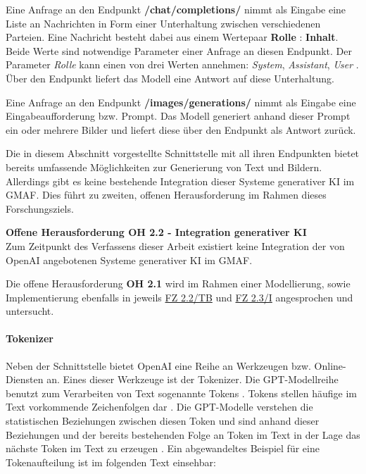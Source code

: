 Eine Anfrage an den Endpunkt \textbf{/chat/completions/} nimmt als Eingabe eine Liste an Nachrichten in Form einer Unterhaltung zwischen verschiedenen Parteien.
Eine Nachricht besteht dabei aus einem Wertepaar \textbf{Rolle} : \textbf{Inhalt}.
Beide Werte sind notwendige Parameter einer Anfrage an diesen Endpunkt.
Der Parameter \textit{Rolle} kann einen von drei Werten annehmen: \textit{System}, \textit{Assistant}, \textit{User} \cite{openai-chat-compl-roles}.
Über den Endpunkt liefert das Modell eine Antwort auf diese Unterhaltung.

Eine Anfrage an den Endpunkt \textbf{/images/generations/} nimmt als Eingabe eine Eingabeaufforderung bzw. Prompt.
Das Modell generiert anhand dieser Prompt ein oder mehrere Bilder und liefert diese über den Endpunkt als Antwort zurück.

Die in diesem Abschnitt vorgestellte Schnittstelle mit all ihren Endpunkten bietet bereits umfassende Möglichkeiten zur Generierung von Text und Bildern.
Allerdings gibt es keine bestehende Integration dieser Systeme generativer KI im GMAF.
Dies führt zu zweiten, offenen Herausforderung im Rahmen dieses Forschungsziels.
\begin{tcolorbox}[minipage, colback=white, colframe=black, arc=0pt, outer arc=0pt]
    \textbf{Offene Herausforderung OH 2.2 - Integration generativer KI} \\
    Zum Zeitpunkt des Verfassens dieser Arbeit existiert keine Integration der von OpenAI angebotenen Systeme generativer KI im GMAF.
\end{tcolorbox}
Die offene Herausforderung \textbf{OH 2.1} wird im Rahmen einer Modellierung, sowie Implementierung ebenfalls in jeweils \hyperref[sec3:model:subsec:fz-integration]{FZ 2.2/TB} und \hyperref[sec4:impl:subsec:fz-integration]{FZ 2.3/I} angesprochen und untersucht. 

\paragraph{Tokenizer}
\label{sec2:sota:par:tokenizer}
Neben der Schnittstelle bietet OpenAI eine Reihe an Werkzeugen bzw. Online-Diensten an.
Eines dieser Werkzeuge ist der Tokenizer.
Die GPT-Modellreihe benutzt zum Verarbeiten von Text sogenannte Tokens \cite{openai-tokenizer}.
Tokens stellen häufige im Text vorkommende Zeichenfolgen dar \cite{openai-tokenizer}.
Die GPT-Modelle verstehen die statistischen Beziehungen zwischen diesen Token und sind anhand dieser Beziehungen und der bereits bestehenden Folge an Token im Text in der Lage das nächste Token im Text zu erzeugen \cite{openai-tokenizer}.
Ein abgewandeltes Beispiel für eine Tokenaufteilung ist im folgenden Text einsehbar:

